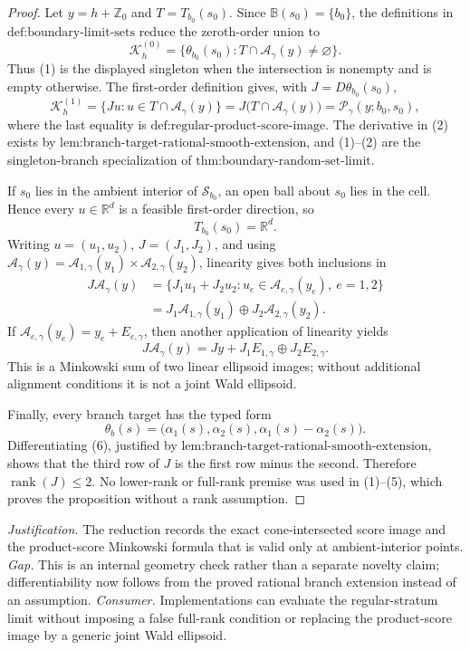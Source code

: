\documentclass{article}
\begin{document}
\begin{proof}
Let \(y=h+\mathbb Z_0\) and \(T=T_{b_0}(s_0)\). Since \(\mathbb B(s_0)=\{b_0\}\), the definitions in \(\text{def:boundary-limit-sets}\) reduce the zeroth-order union to
\[
 \mathcal K_h^{(0)}
 =\{\theta_{b_0}(s_0):T\cap\mathcal A_\gamma(y)\ne\varnothing\}.
 \tag{1}
\]
Thus (1) is the displayed singleton when the intersection is nonempty and is empty otherwise. The first-order definition gives, with \(J=D\theta_{b_0}(s_0)\),
\[
 \mathcal K_h^{(1)}
 =\{Ju:u\in T\cap\mathcal A_\gamma(y)\}
 =J\bigl(T\cap\mathcal A_\gamma(y)\bigr)
 =\mathcal P_\gamma(y;b_0,s_0),
 \tag{2}
\]
where the last equality is \(\text{def:regular-product-score-image}\). The derivative in (2) exists by \(\text{lem:branch-target-rational-smooth-extension}\), and (1)--(2) are the singleton-branch specialization of \(\text{thm:boundary-random-set-limit}\).

If \(s_0\) lies in the ambient interior of \(\mathcal S_{b_0}\), an open ball about \(s_0\) lies in the cell. Hence every \(u\in\mathbb R^d\) is a feasible first-order direction, so
\[
 T_{b_0}(s_0)=\mathbb R^d.
 \tag{3}
\]
Writing \(u=(u_1,u_2)\), \(J=(J_1,J_2)\), and using \(\mathcal A_\gamma(y)=\mathcal A_{1,\gamma}(y_1)\times\mathcal A_{2,\gamma}(y_2)\), linearity gives both inclusions in
\[
 \begin{aligned}
 J\mathcal A_\gamma(y)
 &=\{J_1u_1+J_2u_2:
       u_e\in\mathcal A_{e,\gamma}(y_e),\ e=1,2\}\\
 &=J_1\mathcal A_{1,\gamma}(y_1)
   \oplus J_2\mathcal A_{2,\gamma}(y_2).
 \end{aligned}
 \tag{4}
\]
If \(\mathcal A_{e,\gamma}(y_e)=y_e+E_{e,\gamma}\), then another application of linearity yields
\[
 J\mathcal A_\gamma(y)
 =Jy+J_1E_{1,\gamma}\oplus J_2E_{2,\gamma}.
 \tag{5}
\]
This is a Minkowski sum of two linear ellipsoid images; without additional alignment conditions it is not a joint Wald ellipsoid.

Finally, every branch target has the typed form
\[
 \theta_b(s)=\bigl(\alpha_1(s),\alpha_2(s),
                    \alpha_1(s)-\alpha_2(s)\bigr).
 \tag{6}
\]
Differentiating (6), justified by \(\text{lem:branch-target-rational-smooth-extension}\), shows that the third row of \(J\) is the first row minus the second. Therefore \(\operatorname{rank}(J)\le2\). No lower-rank or full-rank premise was used in (1)--(5), which proves the proposition without a rank assumption.
\end{proof}
\par\smallskip\noindent \textit{Justification.} The reduction records the exact cone-intersected score image and the product-score Minkowski formula that is valid only at ambient-interior points. \textit{Gap.} This is an internal geometry check rather than a separate novelty claim; differentiability now follows from the proved rational branch extension instead of an assumption. \textit{Consumer.} Implementations can evaluate the regular-stratum limit without imposing a false full-rank condition or replacing the product-score image by a generic joint Wald ellipsoid.
\end{document}
